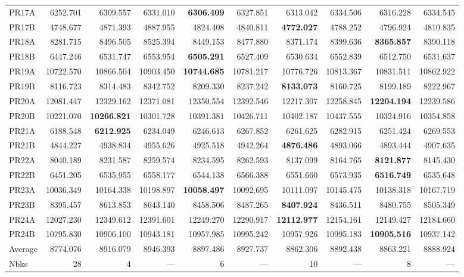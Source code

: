 \documentclass{setp-new}
\begin{document}
\begin{table}[htbp]
{\begin{tabular}{lrrrrrrrrr}
    PR17A & 6252.701 & 6309.557 & 6331.010 & \textbf{6306.409} & 6327.851 & 6313.042 & 6334.506 & 6316.228 & 6334.545\\
    PR17B & 4748.677 & 4871.393 & 4887.955 & 4824.408 & 4840.811 & \textbf{4772.027} & 4788.252 & 4796.924 & 4810.835\\
    PR18A & 8281.715 & 8496.505 & 8525.394 & 8449.153 & 8477.880 & 8371.174 & 8399.636 & \textbf{8365.857} & 8390.118\\
    PR18B & 6447.246 & 6531.747 & 6553.954 & \textbf{6505.291} & 6527.409 & 6530.634 & 6552.839 & 6512.750 & 6531.637\\
    PR19A & 10722.570 & 10866.504 & 10903.450 & \textbf{10744.685} & 10781.217 & 10776.726 & 10813.367 & 10831.511 & 10862.922\\
    PR19B & 8116.723 & 8314.483 & 8342.752 & 8209.330 & 8237.242 & \textbf{8133.073} & 8160.725 & 8199.189 & 8222.967\\
    PR20A & 12081.447 & 12329.162 & 12371.081 & 12350.554 & 12392.546 & 12217.307 & 12258.845 & \textbf{12204.194} & 12239.586\\
    PR20B & 10221.070 & \textbf{10266.821} & 10301.728 & 10391.381 & 10426.711 & 10402.187 & 10437.555 & 10324.916 & 10354.858\\
    PR21A & 6188.548 & \textbf{6212.925} & 6234.049 & 6246.613 & 6267.852 & 6261.625 & 6282.915 & 6251.424 & 6269.553\\
    PR21B & 4844.227 & 4938.834 & 4955.626 & 4925.518 & 4942.264 & \textbf{4876.486} & 4893.066 & 4893.444 & 4907.635\\
    PR22A & 8040.189 & 8231.587 & 8259.574 & 8234.595 & 8262.593 & 8137.099 & 8164.765 & \textbf{8121.877} & 8145.430\\
    PR22B & 6451.205 & 6535.955 & 6558.177 & 6544.138 & 6566.388 & 6551.660 & 6573.935 & \textbf{6516.749} & 6535.648\\
    PR23A & 10036.349 & 10164.338 & 10198.897 & \textbf{10058.497} & 10092.695 & 10111.097 & 10145.475 & 10138.318 & 10167.719\\
    PR23B & 8395.457 & 8613.853 & 8643.140 & 8458.506 & 8487.265 & \textbf{8407.924} & 8436.511 & 8480.755 & 8505.349\\
    PR24A & 12027.230 & 12349.612 & 12391.601 & 12249.270 & 12290.917 & \textbf{12112.977} & 12154.161 & 12149.427 & 12184.660\\
    PR24B & 10795.830 & 10906.100 & 10943.181 & 10957.985 & 10995.242 & 10957.926 & 10995.183 & \textbf{10905.516} & 10937.142\\
    \midrule
    Average & 8774.076 & 8916.079 & 8946.393 & 8897.486 & 8927.737 & 8862.306 & 8892.438 & 8863.221 & 8888.924\\
    Nbks & 28 & 4 & --- & 6 & --- & 10 & --- & 8 & ---\\
    \bottomrule
  \end{tabular}
  }
\end{table}
\end{document}
